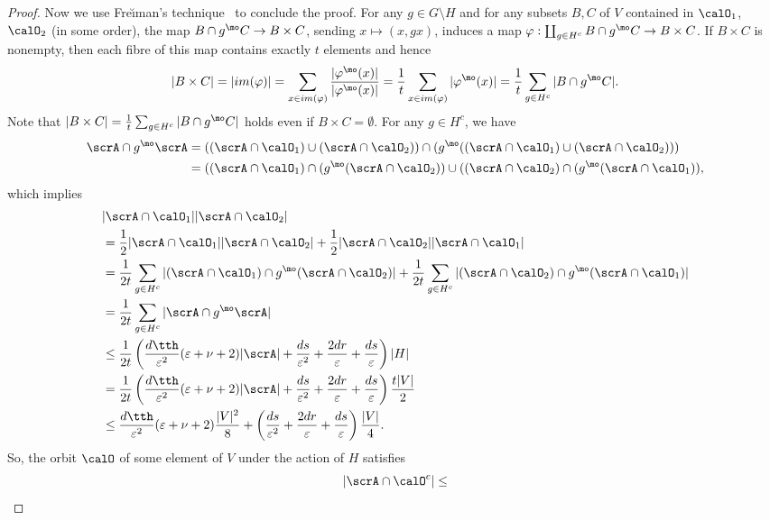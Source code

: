 \begin{proof}
Now we use Fre\u{\i}man's technique~\cite{FreimanGroupsInverseProb} to conclude the proof. For any $g\in G \setminus H$ and for any subsets $B, C$ of $V$ contained in $\calO_1$, $\calO_2$ (in some order), the map 
$B\cap g^\mo C \to B\times C$, sending 
$x\mapsto (x, gx)$, induces a map 
$\varphi: \coprod _{g\in H^c} B\cap g^\mo C \to B\times C$. 
If $B \times C$ is nonempty, then each fibre of this map contains exactly $t$ elements and hence 
$$
|B\times C|
= |im(\varphi)|
= \sum_{x\in im(\varphi) } \frac{|\varphi^\mo (x)|} {|\varphi^\mo (x)|}
= \frac 1 t \sum_{x\in im(\varphi)} |\varphi^\mo (x)|
= \frac 1 t \sum_{g\in H^c} |B\cap g^\mo C|.$$
Note that 
$|B\times C|
= \frac 1 t \sum_{g\in H^c} |B\cap g^\mo C|$
holds even if $B \times C = \emptyset$. 
For any $g\in H^c$, we have 
\begin{align*}
\scrA\cap g^\mo \scrA
& = 
((\scrA\cap \calO_1) \cup (\scrA\cap \calO_2))
\cap 
(g^\mo ((\scrA\cap \calO_1) \cup (\scrA\cap \calO_2)))\\
& = 
((\scrA\cap \calO_1) \cap 
(g^\mo (\scrA\cap \calO_2))
\cup 
((\scrA\cap \calO_2) \cap 
(g^\mo (\scrA\cap \calO_1)),
\end{align*}
which implies 
\begin{align*}
& |\scrA \cap \calO_1| |\scrA\cap \calO_2|\\
& = \frac 12 |\scrA \cap \calO_1| |\scrA\cap \calO_2| + 
\frac 12 |\scrA \cap \calO_2| |\scrA\cap \calO_1|\\
& =
\frac 1 {2t} \sum_{g\in H^c} |(\scrA \cap \calO_1) \cap g^\mo (\scrA \cap \calO_2)| 
+ 
\frac 1{2 t} \sum_{g\in H^c} |(\scrA \cap \calO_2) \cap g^\mo (\scrA \cap \calO_1)| \\
& = 
\frac 1 {2t} \sum_{g\in H^c} |\scrA \cap g^\mo \scrA|\\
& 
\leq \frac 1 {2t} 
\left(
\frac{d \tth}{\varepsilon^2} (\varepsilon + \nu + 2)|\scrA| 
+ \frac{ds}{\varepsilon^2} + \frac{2dr}\varepsilon + \frac{ds}{\varepsilon}
\right)|H|\\
& 
= \frac 1 {2t} 
\left(
\frac{d \tth}{\varepsilon^2} (\varepsilon + \nu + 2)|\scrA| 
+\frac{ds}{\varepsilon^2} + \frac{2dr}\varepsilon + \frac{ds}{\varepsilon}
\right)
\frac{t|V|}2\\
& 
\leq 
\frac{d \tth}{\varepsilon^2} (\varepsilon + \nu + 2)
\frac{|V|^2}8
+ 
\left(\frac{ds}{\varepsilon^2} + \frac{2dr}\varepsilon + \frac{ds}{\varepsilon}
\right)
\frac{|V|}4.
\end{align*}
So, the orbit $\calO$ of some element of $V$ under the action of $H$ satisfies 
$$
|\scrA\cap \calO^c| \leq 
$$
\end{proof}

